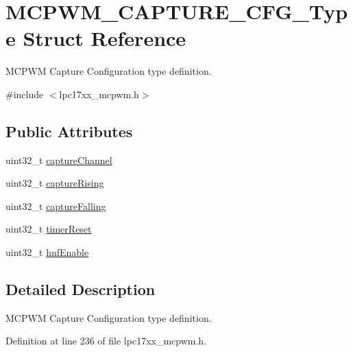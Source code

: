 \hypertarget{struct_m_c_p_w_m___c_a_p_t_u_r_e___c_f_g___type}{\section{\-M\-C\-P\-W\-M\-\_\-\-C\-A\-P\-T\-U\-R\-E\-\_\-\-C\-F\-G\-\_\-\-Type \-Struct \-Reference}
\label{struct_m_c_p_w_m___c_a_p_t_u_r_e___c_f_g___type}
}


\-M\-C\-P\-W\-M \-Capture \-Configuration type definition.  




{\ttfamily \#include $<$lpc17xx\-\_\-mcpwm.\-h$>$}

\subsection*{\-Public \-Attributes}
\begin{DoxyCompactItemize}
\item 
uint32\-\_\-t \hyperlink{struct_m_c_p_w_m___c_a_p_t_u_r_e___c_f_g___type_accecaec18f5966eea170659075341381}{capture\-Channel}
\item 
uint32\-\_\-t \hyperlink{struct_m_c_p_w_m___c_a_p_t_u_r_e___c_f_g___type_aed69de8d9e4d14df5b8243621a246ced}{capture\-Rising}
\item 
uint32\-\_\-t \hyperlink{struct_m_c_p_w_m___c_a_p_t_u_r_e___c_f_g___type_af87795404c1d636839473130a9f86034}{capture\-Falling}
\item 
uint32\-\_\-t \hyperlink{struct_m_c_p_w_m___c_a_p_t_u_r_e___c_f_g___type_af4c01f3f3791aa98051d65b42e25b30b}{timer\-Reset}
\item 
uint32\-\_\-t \hyperlink{struct_m_c_p_w_m___c_a_p_t_u_r_e___c_f_g___type_a14a51979fea6c3f4faed9a12acd9b010}{hnf\-Enable}
\end{DoxyCompactItemize}


\subsection{\-Detailed \-Description}
\-M\-C\-P\-W\-M \-Capture \-Configuration type definition. 

\-Definition at line 236 of file lpc17xx\-\_\-mcpwm.\-h.



